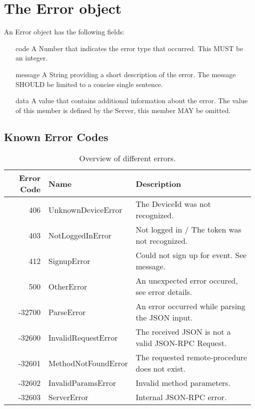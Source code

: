 \documentclass[a4paper]{scrreprt}
\begin{document}
\appendix
\chapter{The Error object}\label{sec:errordict}
An Error object has the following fields\cite{jsonrpc}:
\begin{enumerate}
\item[code]
A Number that indicates the error type that occurred.
This MUST be an integer.
\item[message]
A String providing a short description of the error.
The message SHOULD be limited to a concise single sentence.
\item[data]
A value that contains additional information about the error. The value of this member is defined by the Server, this member MAY be omitted.
\end{enumerate}


\section{Known Error Codes}
\begin{table}[hb]
\centering
\begin{tabular}{| r | l | l |}
\hline
\textbf{Error Code} & \textbf{Name} & \textbf{Description} \\
\hline
406 & UnknownDeviceError & The DeviceId was not recognized.\\
403 & NotLoggedInError & Not logged in / The token was not recognized.\\
412 & SignupError & Could not sign up for event. See message.\\
\hline
500 & OtherError &An unexpected error occured, see error details. \\
-32700 & ParseError & An error occurred while parsing the JSON input.\\
-32600 & InvalidRequestError & The received JSON is not a valid JSON-RPC Request.\\
-32601 & MethodNotFoundError & The requested remote-procedure does not exist.\\
-32602 & InvalidParamsError & Invalid method parameters.\\
-32603 & ServerError& Internal JSON-RPC error.\\
\hline
\end{tabular}
\caption{Overview of different errors.}
\end{table}
\end{document}
